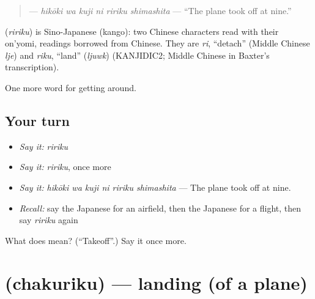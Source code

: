 \begin{quote}
\textbf{  } — \emph{hikōki wa kuji ni ririku shimashita} — \textquotedblleft{}The plane took off at nine.\textquotedblright{}
\end{quote}

\begin{cousinweb}
\textbf{} (\emph{ririku}) is Sino-Japanese (kango): two Chinese characters read with their on'yomi, readings borrowed from Chinese. They are \emph{ri}, \textquotedblleft{}detach\textquotedblright{} (Middle Chinese \emph{lje}) and \emph{riku}, \textquotedblleft{}land\textquotedblright{} (\emph{ljuwk}) (KANJIDIC2; Middle Chinese in Baxter's transcription).
\end{cousinweb}

\begin{grammarlens}[title={What you've built}]
One more word for getting around.
\end{grammarlens}

\subsection*{Your turn}
\begin{itemize}
\raggedright
  \item \emph{Say it:} \emph{ririku}
  \item \emph{Say it:} \emph{ririku}, once more
  \item \emph{Say it:} \emph{hikōki wa kuji ni ririku shimashita} — The plane took off at nine.
  \item \emph{Recall:} say the Japanese for an airfield, then the Japanese for a flight, then say \emph{ririku} again
\end{itemize}

\begin{tcolorbox}[breakable,colback=teal!4,colframe=teal!35!black,title={Before you move on}]
What does  mean? (\textquotedblleft{}Takeoff\textquotedblright{}.) Say it once more.
\end{tcolorbox}
\section[\texorpdfstring{\ja{ちゃくりく} (chakuriku)}{ちゃくりく (chakuriku)}]{ (chakuriku) — landing (of a plane)}

\label{lesson:JA-C384-chakuriku}



